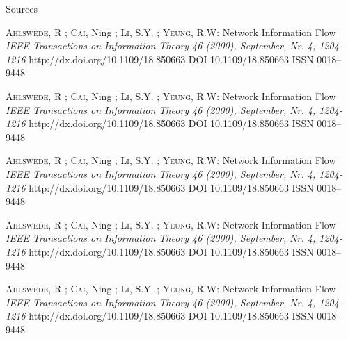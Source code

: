 \multipleslidetrue
\begin{frame}[allowframebreaks]{Sources}   

  \begin{thebibliography}{9}  

    \Fontvi

    \textsc{Ahlswede}, R ; \textsc{Cai}, Ning  ; \textsc{Li},
      S.Y. ; \textsc{Yeung},  R.W:
    \newblock Network Information Flow
    \emph{IEEE Transactions on Information Theory 46 (2000), September, Nr. 4, 1204-1216}
    \newblock http://dx.doi.org/10.1109/18.850663
    \newblock DOI 10.1109/18.850663
    \newblock ISSN 0018–9448

    \textsc{Ahlswede}, R ; \textsc{Cai}, Ning  ; \textsc{Li},
      S.Y. ; \textsc{Yeung},  R.W:
    \newblock Network Information Flow
    \emph{IEEE Transactions on Information Theory 46 (2000), September, Nr. 4, 1204-1216}
    \newblock http://dx.doi.org/10.1109/18.850663
    \newblock DOI 10.1109/18.850663
    \newblock ISSN 0018–9448

    \textsc{Ahlswede}, R ; \textsc{Cai}, Ning  ; \textsc{Li},
      S.Y. ; \textsc{Yeung},  R.W:
    \newblock Network Information Flow
    \emph{IEEE Transactions on Information Theory 46 (2000), September, Nr. 4, 1204-1216}
    \newblock http://dx.doi.org/10.1109/18.850663
    \newblock DOI 10.1109/18.850663
    \newblock ISSN 0018–9448

    \textsc{Ahlswede}, R ; \textsc{Cai}, Ning  ; \textsc{Li},
      S.Y. ; \textsc{Yeung},  R.W:
    \newblock Network Information Flow
    \emph{IEEE Transactions on Information Theory 46 (2000), September, Nr. 4, 1204-1216}
    \newblock http://dx.doi.org/10.1109/18.850663
    \newblock DOI 10.1109/18.850663
    \newblock ISSN 0018–9448

    \textsc{Ahlswede}, R ; \textsc{Cai}, Ning  ; \textsc{Li},
      S.Y. ; \textsc{Yeung},  R.W:
    \newblock Network Information Flow
    \emph{IEEE Transactions on Information Theory 46 (2000), September, Nr. 4, 1204-1216}
    \newblock http://dx.doi.org/10.1109/18.850663
    \newblock DOI 10.1109/18.850663
    \newblock ISSN 0018–9448


\end{thebibliography}
\end{frame}
